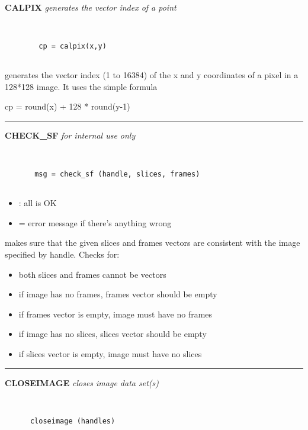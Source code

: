 \def\endfunchelp{\par\medskip\noindent\rule{\textwidth}{1pt}\par\bigskip}

{\large\bf CALPIX} {\em  generates the vector index of a point}
\begin{verbatim}


        cp = calpix(x,y)


\end{verbatim}

  generates the vector index (1 to 16384) of 
  the x and y coordinates of a pixel in a 128*128 image.
  It uses the simple formula 
 
        cp = round(x) + 128 * round(y-1)
 
\endfunchelp


{\large\bf CHECK\_SF} {\em  for internal use only}
\begin{verbatim}


       msg = check_sf (handle, slices, frames)


\end{verbatim}

\begin{itemize}
\item {}: all is OK
\item {} = error message if there's anything wrong
\end{itemize}

  makes sure that the given slices and frames vectors
  are consistent with the image specified by handle.  Checks for:

\begin{itemize}
\item both slices and frames cannot be vectors
\item if image has no frames, frames vector should be empty
\item if frames vector is empty, image must have no frames
\item if image has no slices, slices vector should be empty
\item if slices vector is empty, image must have no slices
\end{itemize}

\endfunchelp


{\large\bf CLOSEIMAGE} {\em  closes image data set(s)}
\begin{verbatim}


      closeimage (handles)


\end{verbatim}

